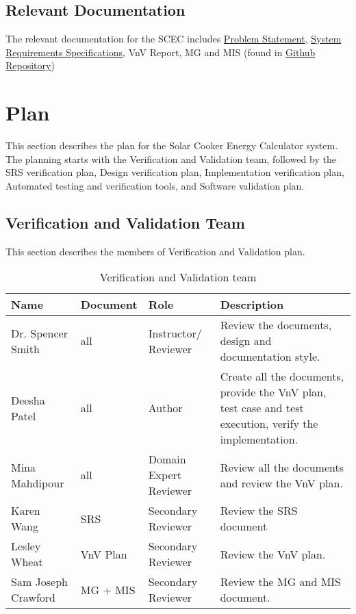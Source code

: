 \documentclass[12pt, titlepage]{article}
\begin{document}
\subsection{Relevant Documentation}

The relevant documentation for the SCEC includes \href{https://github.com/DeeshaPatel/CAS-741-Solar-Cooker/blob/7c53c8d9a19ca2f94dfba6ba9208eae0bf03b8cc/docs/ProblemStatementAndGoals/ProblemStatement.pdf}{Problem Statement}, \href{https://github.com/DeeshaPatel/CAS-741-Solar-Cooker/blob/7c53c8d9a19ca2f94dfba6ba9208eae0bf03b8cc/docs/SRS/SRS.pdf}{System Requirements Specifications}, VnV Report, MG and MIS (found in \href{https://github.com/DeeshaPatel/CAS-741-Solar-Cooker/tree/main/docs}{Github Repository})  


\section{Plan}
\label{plan}

This section describes the plan for the Solar Cooker Energy Calculator system. The planning starts with the Verification and Validation team, followed by the SRS verification plan, Design verification plan, Implementation verification plan, Automated testing and verification tools, and Software validation plan.  

\subsection{Verification and Validation Team}

This section describes the members of Verification and Validation plan. 

\begin{center}
\begin{table}[h!]
\begin{tabular}{ |l|l|p{2cm}|p{5cm}| } 
\hline
\rowcolor[gray]{0.9}
\textbf{Name} & \textbf{Document} & \textbf{Role} & \textbf{Description} \\
\hline
 Dr. Spencer Smith & all & Instructor/ Reviewer & Review the documents, design and documentation style. \\ 
 \hline
 Deesha Patel & all & Author & Create all the documents, provide the VnV plan, test case and test execution, verify the implementation. \\  
 \hline
 Mina Mahdipour & all & Domain Expert Reviewer & Review all the documents and review the VnV plan. \\  
 \hline
 Karen Wang & SRS & Secondary Reviewer & Review the SRS document \\
 \hline
Lesley  Wheat & VnV Plan & Secondary Reviewer & Review the VnV plan. \\ 
\hline 
Sam Joseph Crawford & MG + MIS & Secondary Reviewer & Review the MG and MIS document. \\
\hline 

\hline
\end{tabular}
\caption{Verification and Validation team} 
\end{table}
\end{center}
\end{document}
